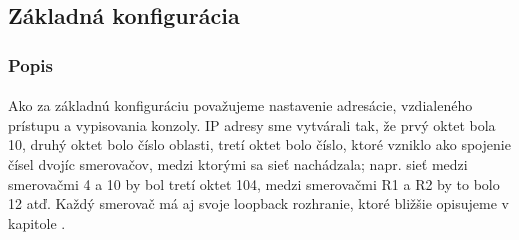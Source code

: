 \documentclass[12pt,twoside,a4paper]{report}
\begin{document}
\subsection{Základná konfigurácia}
\subsubsection{Popis}
\paragraph{}
Ako za základnú konfiguráciu považujeme nastavenie adresácie, vzdialeného prístupu a vypisovania konzoly. IP adresy sme vytvárali tak, že prvý oktet bola 10, druhý oktet bolo číslo oblasti, tretí oktet bolo číslo, ktoré vzniklo ako spojenie čísel dvojíc smerovačov, medzi ktorými sa sieť nachádzala; napr. sieť medzi smerovačmi 4 a 10 by bol tretí oktet 104, medzi smerovačmi R1 a R2 by to bolo 12 atď. Každý smerovač má aj svoje loopback rozhranie, ktoré bližšie opisujeme v kapitole .
\end{document}

